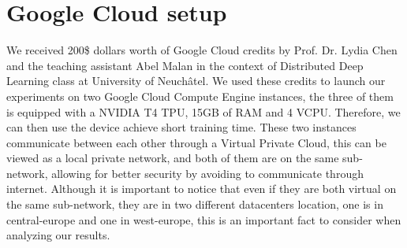 \section{Google Cloud setup}
We received 200\$ dollars worth of Google Cloud credits by Prof. Dr. Lydia Chen and the teaching assistant Abel Malan in the context of Distributed Deep Learning class at University of Neuchâtel. We used these credits to launch our experiments on two Google Cloud Compute Engine instances, the three of them is equipped with a NVIDIA T4 TPU, 15GB of RAM and 4 VCPU. Therefore, we can then use the  device achieve short training time. These two instances communicate between each other through a Virtual Private Cloud, this can be viewed as a local private network, and both of them are on the same sub-network, allowing for better security by avoiding to communicate through internet. Although it is important to notice that even if they are both virtual on the same sub-network, they are in two different datacenters location, one is in central-europe and one in west-europe, this is an important fact to consider when analyzing our results.
